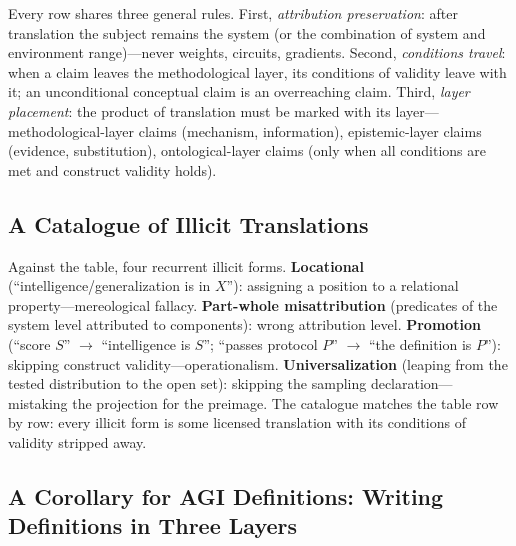 \documentclass[10pt]{article}
\begin{document}
Every row shares three general rules. First, \emph{attribution preservation}: after translation the subject remains the system (or the combination of system and environment range)---never weights, circuits, gradients. Second, \emph{conditions travel}: when a claim leaves the methodological layer, its conditions of validity leave with it; an unconditional conceptual claim is an overreaching claim. Third, \emph{layer placement}: the product of translation must be marked with its layer---methodological-layer claims (mechanism, information), epistemic-layer claims (evidence, substitution), ontological-layer claims (only when all conditions are met and construct validity holds).

\subsection{A Catalogue of Illicit Translations}

Against the table, four recurrent illicit forms. \textbf{Locational} (``intelligence/generalization is in $X$''): assigning a position to a relational property---mereological fallacy. \textbf{Part-whole misattribution} (predicates of the system level attributed to components): wrong attribution level. \textbf{Promotion} (``score $S$'' $\to$ ``intelligence is $S$''; ``passes protocol $P$'' $\to$ ``the definition is $P$''): skipping construct validity---operationalism. \textbf{Universalization} (leaping from the tested distribution to the open set): skipping the sampling declaration---mistaking the projection for the preimage. The catalogue matches the table row by row: every illicit form is some licensed translation with its conditions of validity stripped away.

\subsection{A Corollary for AGI Definitions: Writing Definitions in Three Layers}
\end{document}
